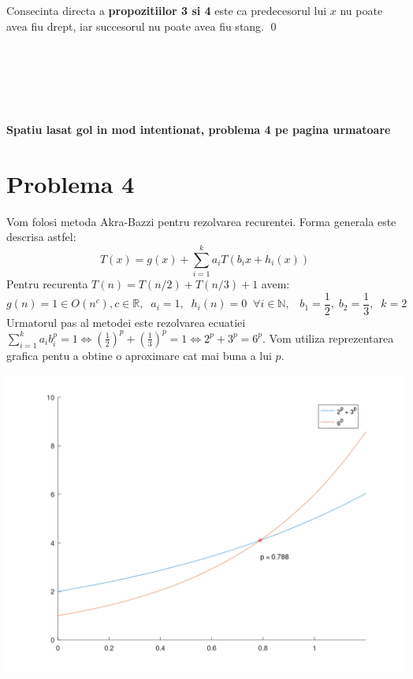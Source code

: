 \documentclass[12pt]{article}
\begin{document}
Consecinta directa a \textbf{propozitiilor 3 si 4} este ca predecesorul lui $x$ nu poate avea fiu drept, iar succesorul nu poate avea fiu stang. \qed
\\ \\ \\ \\ \\ \\ 
\begin{center}
    \textbf{Spatiu lasat gol in mod intentionat, problema 4 pe pagina urmatoare}
\end{center}

\newpage

\section*{Problema 4}
Vom folosi metoda Akra-Bazzi pentru rezolvarea recurentei. Forma generala este descrisa astfel:
\begin{equation*}
    T(x) = g(x) + \sum\limits_{i=1}^{k} {a_iT(b_ix+h_i(x))}
\end{equation*}
Pentru recurenta $T(n) = T(n / 2) + T(n / 3) + 1$ avem:
\begin{equation*}
    g(n) = 1 \in O(n^c), c \in \mathbb{R}, \;\; a_i = 1, \;\; h_i(n) = 0 \;\; \forall i \in \mathbb{N}, \;\;\; b_1 = \frac{1}{2}, \; b_2 = \frac{1}{3}, \;\; k = 2
\end{equation*}
Urmatorul pas al metodei este rezolvarea ecuatiei $\sum\limits_{i=1}^{k} {a_ib_i^p}=1 \Longleftrightarrow (\frac{1}{2})^p + (\frac{1}{3})^p = 1 \Longleftrightarrow 2^p + 3^p = 6^p$. Vom utiliza reprezentarea grafica pentu a obtine o aproximare cat mai buna a lui $p$. \\

\begin{center}
    \includegraphics[scale=0.35]{ecuatie.png}
\end{center}
\end{document}
